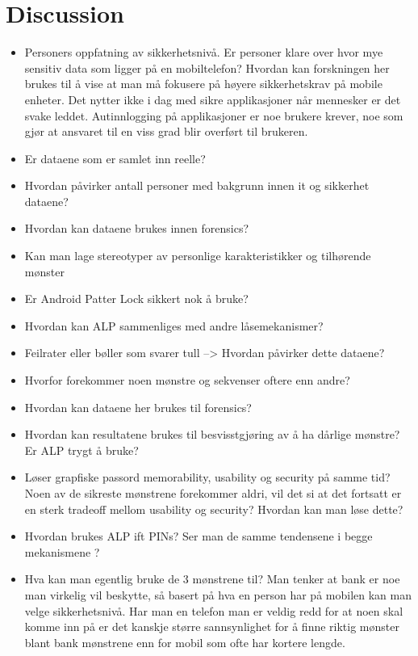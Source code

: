 \chapter{Discussion}\label{chap:discussion}

	\begin{itemize}
		\item Personers oppfatning av sikkerhetsnivå. Er personer klare over hvor mye sensitiv data som ligger på en mobiltelefon? Hvordan kan forskningen her brukes til å vise at man må fokusere på høyere sikkerhetskrav på mobile enheter. Det nytter ikke i dag med sikre applikasjoner når mennesker er det svake leddet. Autinnlogging på applikasjoner er noe brukere krever, noe som gjør at ansvaret til en viss grad blir overført til brukeren.
		\item Er dataene som er samlet inn reelle? 
		\item Hvordan påvirker antall personer med bakgrunn innen it og sikkerhet dataene?
		\item Hvordan kan dataene brukes innen forensics?
		\item Kan man lage stereotyper av personlige karakteristikker og tilhørende mønster
		\item Er Android Patter Lock sikkert nok å bruke?
		\item Hvordan kan ALP sammenliges med andre låsemekanismer?
		\item Feilrater eller bøller som svarer tull --> Hvordan påvirker dette dataene?
		\item Hvorfor forekommer noen mønstre og sekvenser oftere enn andre?
		\item Hvordan kan dataene her brukes til forensics?
		\item Hvordan kan resultatene brukes til besvisstgjøring av å ha dårlige mønstre? Er ALP trygt å bruke?
		\item Løser grapfiske passord memorability, usability og security på samme tid? Noen av de sikreste mønstrene forekommer aldri, vil det si at det fortsatt er en sterk tradeoff mellom usability og security? Hvordan kan man løse dette?
		\item Hvordan brukes ALP ift PINs? Ser man de samme tendensene i begge mekanismene ?
		\item Hva kan man egentlig bruke de 3 mønstrene til? Man tenker at bank er noe man virkelig vil beskytte, så basert på hva en person har på mobilen kan man velge sikkerhetsnivå. Har man en telefon man er veldig redd for at noen skal komme inn på er det kanskje større sannsynlighet for å finne riktig mønster blant bank mønstrene enn for mobil som ofte har kortere lengde. 
	\end{itemize}


